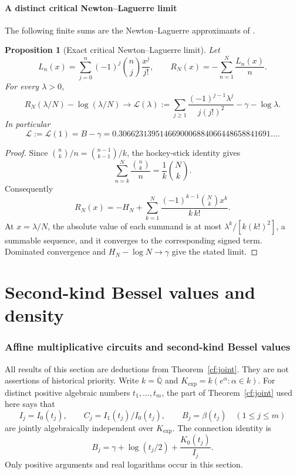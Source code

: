 \documentclass[11pt]{article}
\newtheorem{proposition}[theorem]{Proposition}
\theoremstyle{definition}
\theoremstyle{remark}
\begin{document}
\subsection{A distinct critical Newton--Laguerre limit}
The following finite sums are the Newton--Laguerre approximants of \cite{Gamma}.
\begin{proposition}[Exact critical Newton--Laguerre limit]
\label{prim:limit}
Let
\[
 L_n(x)=\sum_{j=0}^n(-1)^j\binom nj\frac{x^j}{j!},
 \qquad R_N(x)=-\sum_{n=1}^N\frac{L_n(x)}n.
\]
For every $\lambda>0$,
\[
 R_N(\lambda/N)-\log(\lambda/N)\longrightarrow
 \mathcal L(\lambda):=
 \sum_{j\ge1}\frac{(-1)^{j-1}\lambda^j}{j(j!)^2}
       -\gamma-\log\lambda.
\]
In particular
\[
 \mathcal L:=\mathcal L(1)=B-\gamma
 =0.3066231395146690006884066448658841691\ldots.
\]
\end{proposition}
\begin{proof}
Since $\binom nk/n=\binom{n-1}{k-1}/k$, the hockey-stick identity gives
\[
 \sum_{n=k}^N\frac{\binom nk}{n}=\frac1k\binom Nk.
\]
Consequently
\[
 R_N(x)=-H_N+
  \sum_{k=1}^N\frac{(-1)^{k-1}\binom Nk x^k}{k\,k!}.
\]
At $x=\lambda/N$, the absolute value of each summand is at most
$\lambda^k/[k(k!)^2]$, a summable sequence, and it converges to the
corresponding signed term. Dominated convergence and
$H_N-\log N\to\gamma$ give the stated limit.
\end{proof}


\part{Second-kind Bessel values and density}

\section{Affine multiplicative circuits and second-kind Bessel values}
\label{kd:section}

All results of this section are deductions from
Theorem~\ref{cf:joint}. They are not assertions of historical priority.
Write $k=\overline{\mathbb Q}$ and
$K_{\exp}=k(e^\alpha:\alpha\in k)$.  For distinct positive algebraic
numbers $t_1,\ldots,t_m$, the part of Theorem~\ref{cf:joint} used here says that
\[
 I_j=I_0(t_j),\qquad C_j=I_1(t_j)/I_0(t_j),\qquad
 B_j=\beta(t_j)
 \quad(1\leq j\leq m)
\]
are jointly algebraically independent over $K_{\exp}$.  The connection
identity is
\begin{equation}\label{kd:connection}
 B_j=\gamma+\log(t_j/2)+\frac{K_0(t_j)}{I_j}.
\end{equation}
Only positive arguments and real logarithms occur in this section.
\end{document}
